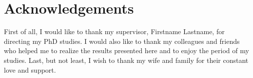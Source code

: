 \vspace*{\fill}

\section*{Acknowledgements}
First of all, I would like to thank my supervisor, Firstname Lastname, for directing my PhD studies. I would also like to thank my colleagues and friends who helped me to realize the results presented here and to enjoy the period of my studies. 
Last, but not least, I wish to thank my wife and family for their constant love and support.

\vspace*{\fill}